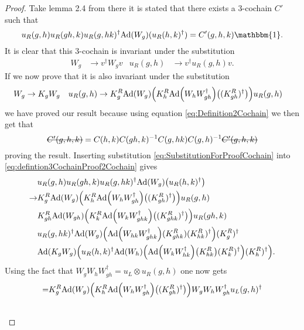 \documentclass[12pt,a4paper,twoside]{article}
\newcommand{\stkout}[1]{\ifmmode\text{\sout{\ensuremath{#1}}}\else\sout{#1}\fi}
\let\originalleft\left
\let\originalright\right
\renewcommand{\left}{\mathopen{}\mathclose\bgroup\originalleft}
\renewcommand{\right}{\aftergroup\egroup\originalright}
\newcommand{\Ad}[1]{\textrm{Ad}\left(#1\right)}
\theoremstyle{definition}
\numberwithin{equation}{section}
\begin{document}
\begin{proof}
	Take lemma 2.4 from \cite{ogata2021h3gmathbb} there it is stated that there exists a 3-cochain $C'$ such that
	\begin{equation}\label{eq:defintion3CochainProof2Cochain}
		u_R(g,h)u_R(gh,k)u_R(g,hk)^\dagger\Ad{W_g}(u_R(h,k)^\dagger)=C'(g,h,k)\mathbbm{1}.
	\end{equation}
	It is clear that this 3-cochain is invariant under the substitution
	\begin{align}
		W_g&\rightarrow v^\dagger W_g v&u_R(g,h)&\rightarrow v^\dagger u_R(g,h)v.
	\end{align}
	If we now prove that it is also invariant under the substitution
	\begin{align}\label{eq:SubstitutionForProofCochain}
		W_g&\rightarrow K_g W_g&u_R(g,h)&\rightarrow K_g^R\Ad{W_g}\left(K_h^R\Ad{W_hW_{gh}^\dagger}\left((K_{gh}^R)^\dagger\right)\right)u_
		R(g,h)
	\end{align}
	we have proved our result because using equation \eqref{eq:Definition2Cochain} we then get that
	\begin{equation}
		\stkout{C'(g,h,k)}=C(h,k)C(gh,k)^{-1}C(g,hk)C(g,h)^{-1}\stkout{C'(g,h,k)}
	\end{equation}
	proving the result. Inserting substitution \eqref{eq:SubstitutionForProofCochain} into \eqref{eq:defintion3CochainProof2Cochain} gives
	\begin{align}
		&u_R(g,h)u_R(gh,k)u_R(g,hk)^\dagger\Ad{W_g}\left(u_R(h,k)^\dagger\right)\\
		\rightarrow&K_g^R\Ad{W_g}\left(K_h^R\Ad{W_hW_{gh}^\dagger}\left((K_{gh}^R)^\dagger\right)\right)u_
		R(g,h)\\
		\nonumber
		&K_{gh}^R\Ad{W_{gh}}\left(K_k^R\Ad{W_kW_{ghk}^\dagger}\left((K_{ghk}^R)^\dagger\right)\right)u_
		R(gh,k)\\
		\nonumber
		&u_R(g,hk)^\dagger \Ad{W_g}\left( \Ad{W_{hk}W_{ghk}^\dagger}(K^R_{ghk})(K^R_{hk})^{\dagger} \right)(K^R_g)^\dagger\\
		\nonumber
		&\Ad{K_gW_g}\left(u_R(h,k)^\dagger \Ad{W_h}\left(\Ad{W_kW_{hk}^\dagger}\left(K_{hk}^R\right)(K^R_k)^\dagger\right)(K^R_h)^\dagger\right).
	\end{align}
	Using the fact that $W_gW_hW_{gh}^\dagger=u_L\otimes u_R(g,h)$ one now gets
	\begin{align}
		=&K_g^R\Ad{W_g}\left(K_h^R\Ad{W_hW_{gh}^\dagger}\left((K_{gh}^R)^\dagger\right)\right)W_gW_hW_{gh}^\dagger u_L(g,h)^\dagger\\
		\nonumber

\end{align}
\end{proof}
\end{document}
